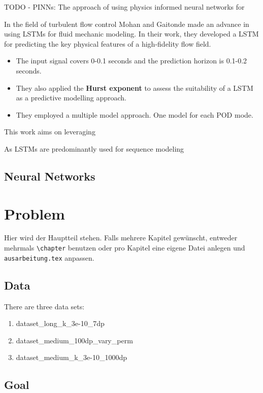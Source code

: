 \documentclass[
  a4paper,  %
  twoside,  %
  bibliography=totoc,
  headsepline,
  cleardoublepage=empty,
  parskip=half,
  draft=false
]{scrbook}
\begin{document}
TODO - PINNs: The approach of using physics informed neural networks for 

In the field of turbulent flow control Mohan and Gaitonde \cite{mohan2018deep} made an advance in using LSTMs for fluid mechanic modeling. In their work, they developed a LSTM for predicting the key physical features of a high-fidelity flow field. 

\begin{itemize}
    \item The input signal covers 0-0.1 seconds and the prediction horizon is 0.1-0.2 seconds. 
    \item They also applied the \textbf{Hurst exponent} to assess the suitability of a LSTM as a predictive modelling approach.
    \item They employed a multiple model approach. One model for each POD mode.
\end{itemize}


This work aims on leveraging 

As LSTMs are predominantly used for sequence modeling 






\section{Neural Networks}
\chapter{Problem}
\label{chap:k2}

Hier wird der Hauptteil stehen. Falls mehrere Kapitel gewünscht, entweder mehrmals \texttt{\textbackslash{}chapter} benutzen oder pro Kapitel eine eigene Datei anlegen und \texttt{ausarbeitung.tex} anpassen.


\section{Data}
There are three data sets:

\begin{enumerate}
    \item dataset\_long\_k\_3e-10\_7dp
    \item dataset\_medium\_100dp\_vary\_perm
    \item dataset\_medium\_k\_3e-10\_1000dp
\end{enumerate}
\section{Goal}
\end{document}
